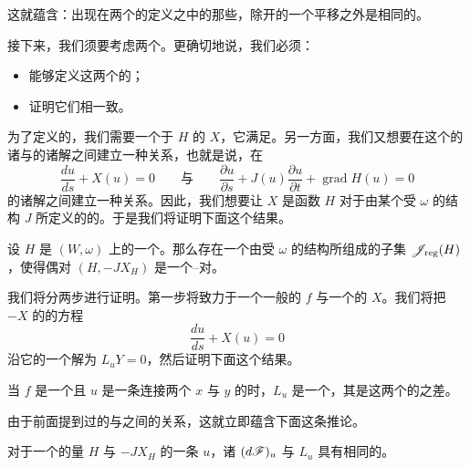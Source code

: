 这就蕴含：出现在两个\trComplex{}的定义之中的那些\trVectorSpace{}，除开\trIndex{}的一个平移之外是相同的。

接下来，我们须要考虑两个\trDifferential。更确切地说，我们必须：
\begin{itemize}
\item 能够定义这两个\trComplex{}的\trDifferential；
\item 证明它们相一致。
\end{itemize}

为了定义\trMorseComplex{}的\trDifferential，我们需要一个\trAdapted{}于\trMorseFunction{} $H$ 的\trVectorField{} $X$，它满足\trSmaleCondition。另一方面，我们又想要在这个\trVectorField{}的诸\trTrajectory{}与\trFloerEquation{}的诸解之间建立一种关系，也就是说，在
\[ \frac{du}{ds}+X(u)=0 \qquad\text{与}\qquad \frac{\partial u}{\partial s}+J(u)\frac{\partial u}{\partial t}+\operatorname{grad}H(u)=0 \]
的诸解之间建立一种关系。因此，我们想要让 $X$ 是函数 $H$ 对于由某个受 $\omega$ \trCalibrated{}的\trAlmostComplex{}结构 $J$ 所定义的\trMetric{}的\trGradient。于是我们将证明下面这个结果。

\begin{theorem}\label{thm:calibrated-dense-morse-smale}
设 $H$ 是\trSymplectic\trManifold{} $(W,\omega)$ 上的一个\trMorseFunction。那么存在一个由受 $\omega$ \trCalibrated{}的\trAlmostComplex{}结构所组成的\trDense{}子集 $\mathscr{J}_{\mathrm{reg}}(H)$，使得偶对 $(H,-JX_{H})$ 是一个\trMorse--\trSmale{}对。
\end{theorem}

我们将分两步进行证明。第一步将致力于一个一般的\trMorseFunction{} $f$ 与一个\trAdapted{}的\trVectorField{} $X$。我们将把\trVectorField{} $-X$ 的\trFlow{}的方程
\[ \frac{du}{ds}+X(u)=0 \]
沿它的一个解\trLinearization{}为 $L_{u}Y=0$，然后证明下面这个结果。

\begin{theorem}\label{thm:lu-fredholm-index-difference}
当 $f$ 是一个\trMorseFunction{}且 $u$ 是一条连接两个\trCriticalPoint{} $x$ 与 $y$ 的\trTrajectory{}时，$L_{u}$ 是一个\trFredholmOperator，其\trIndex{}是这两个\trCriticalPoint{}的\trMorse{}\trIndex{}之差。
\end{theorem}

由于前面提到过的\trMorse{}\trIndex{}与\trMaslov{}\trIndex{}之间的关系，这就立即蕴含下面这条推论。

\begin{corollary}\label{thm:df-lu-same-index}
对于一个\trNondegenerate{}的\trHamiltonian{}量 $H$ 与 $-JX_{H}$ 的一条\trTrajectory{} $u$，诸\trFredholmOperator{} $(d\mathscr{F})_{u}$ 与 $L_{u}$ 具有相同的\trIndex。
\end{corollary}

